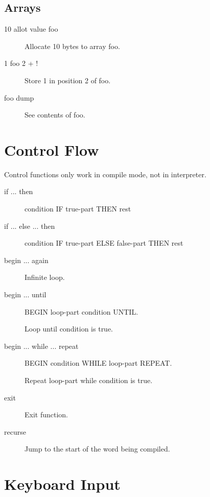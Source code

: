 \subsection{Arrays}

\begin{description}
\item[10 allot value foo] Allocate 10 bytes to array foo.
\item[1 foo 2 + !] Store 1 in position 2 of foo.
\item[foo dump] See contents of foo.
\end{description}


\section{Control Flow}

Control functions only work in compile mode, not in interpreter.

\begin{description}
\item[if ... then]

condition IF true-part THEN rest

\item[if ... else ... then]

condition IF true-part ELSE false-part THEN rest

\item[begin ... again]

Infinite loop.

\item[begin ... until]

BEGIN loop-part condition UNTIL.

Loop until condition is true.

\item[begin ... while ... repeat]

BEGIN condition WHILE loop-part REPEAT.

Repeat loop-part while condition is true.

\item[exit]

Exit function.

\item[recurse] Jump to the start of the word being compiled.

\end{description}

\section{Keyboard Input}

